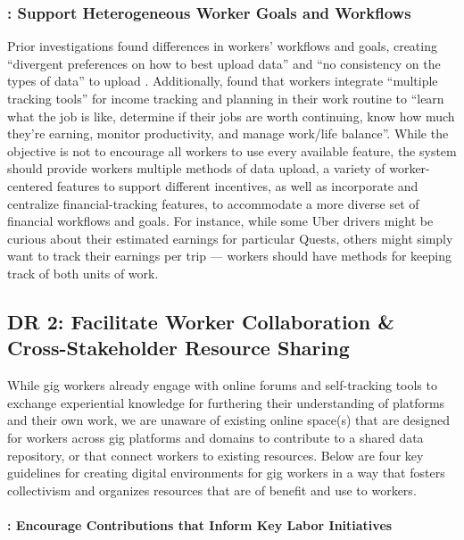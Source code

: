 \subsubsection*{: \textbf{Support Heterogeneous Worker Goals and Workflows}}
\label{DR1.3}
Prior investigations found differences in workers' workflows and goals, {creating ``divergent preferences on how to best upload data''} \cite{supporting} {and ``no consistency on the types of data'' to upload \cite{stein2023you}}. 
{Additionally, \citet{accountable} found that workers integrate ``multiple tracking tools''
for income tracking and planning in their work routine to ``learn what the job is like, determine if their jobs are worth continuing, know how much they’re earning, monitor productivity, and manage work/life balance''.}
{While the objective is not to encourage all workers to use every available feature, }the system should provide workers multiple methods of data upload, a variety of worker-centered features to support different incentives{, as well as incorporate and centralize financial-tracking features}, to accommodate a more diverse set of {financial} workflows and goals.
For instance, while some Uber drivers might be curious about their estimated earnings for particular Quests, others might simply want to track their earnings per trip {\cite{zhang2023stakeholder}} --- workers should have methods for keeping track of both units of work. 


\subsection{DR 2: Facilitate Worker Collaboration \& {Cross-Stakeholder} Resource Sharing}
\label{DR2}
{While} gig workers {already} engage with online forums \cite{atom} and self-tracking tools \cite{accountable} {to exchange experiential knowledge for furthering their understanding of platforms and their own work,} {we are unaware of existing }online space{(s)} {that are designed for workers across gig platforms and domains to} contribute to a shared data repository, or {that connect workers to existing resources}. Below are four key guidelines for creating digital environments for gig workers in a way that fosters collectivism and organizes resources {that are} of benefit and use to workers.

\paragraph{: \textbf{Encourage {Contributions that Inform Key Labor} {Initiatives}}} 

